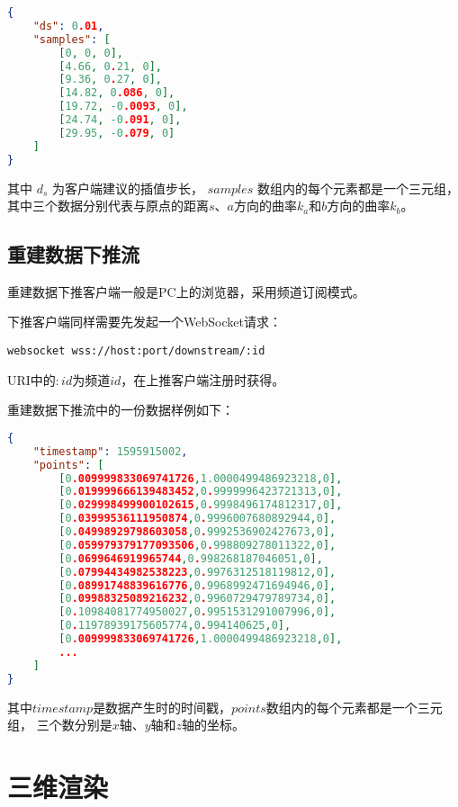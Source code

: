 \begin{lstlisting}[language=json,firstnumber=1]
{
    "ds": 0.01,
    "samples": [
        [0, 0, 0],
        [4.66, 0.21, 0],
        [9.36, 0.27, 0],
        [14.82, 0.086, 0],
        [19.72, -0.0093, 0],
        [24.74, -0.091, 0],
        [29.95, -0.079, 0]
    ]
}
\end{lstlisting}

其中 $d_s$ 为客户端建议的插值步长，
$samples$ 数组内的每个元素都是一个三元组，其中三个数据分别代表与原点的距离$s$、$a$方向的曲率$k_a$和$b$方向的曲率$k_b$。

\subsection{重建数据下推流}

重建数据下推客户端一般是PC上的浏览器，采用频道订阅模式。

下推客户端同样需要先发起一个WebSocket请求：

\begin{lstlisting}
websocket wss://host:port/downstream/:id
\end{lstlisting}

URI中的$:id$为频道$id$，在上推客户端注册时获得。

重建数据下推流中的一份数据样例如下：

\begin{lstlisting}[language=json,firstnumber=1]
{
    "timestamp": 1595915002,
    "points": [
        [0.009999833069741726,1.0000499486923218,0],
        [0.019999666139483452,0.9999996423721313,0],
        [0.029998499900102615,0.9998496174812317,0],
        [0.03999536111950874,0.9996007680892944,0],
        [0.04998929798603058,0.9992536902427673,0],
        [0.059979379177093506,0.998809278011322,0],
        [0.0699646919965744,0.998268187046051,0],
        [0.07994434982538223,0.9976312518119812,0],
        [0.08991748839616776,0.9968992471694946,0],
        [0.09988325089216232,0.9960729479789734,0],
        [0.10984081774950027,0.9951531291007996,0],
        [0.11978939175605774,0.994140625,0],
        [0.009999833069741726,1.0000499486923218,0],
        ...
    ]
}
\end{lstlisting}

其中$timestamp$是数据产生时的时间戳，$points$数组内的每个元素都是一个三元组，
三个数分别是$x$轴、$y$轴和$z$轴的坐标。

\section{三维渲染}

